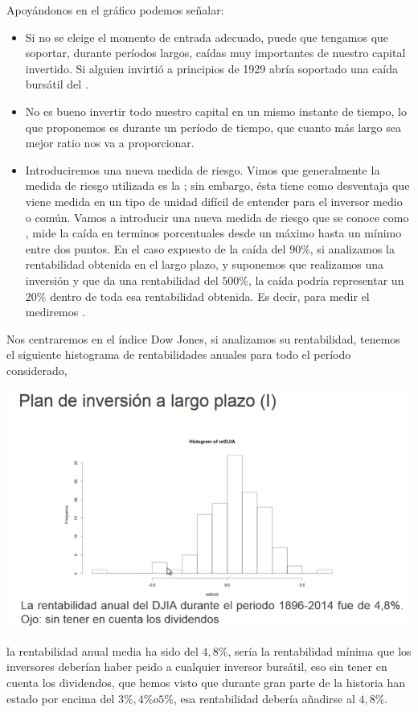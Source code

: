 Apoyándonos en el gráfico podemos señalar:
\begin{itemize}
    \item Si no se eleige el momento de entrada adecuado, puede que tengamos que soportar, durante períodos largos, caídas muy importantes de nuestro capital invertido. Si alguien invirtió a principios de 1929 abría soportado una caída bursátil del .
    \item No es bueno invertir todo nuestro capital en un mismo instante de tiempo, lo que proponemos es  durante un período de tiempo, que cuanto más largo sea mejor ratio  nos va a proporcionar.
    \item Introduciremos una nueva medida de riesgo. Vimos que generalmente la medida de riesgo utilizada es la ; sin embargo, ésta tiene como desventaja que viene medida en un tipo de unidad difícil de entender para el inversor medio o común. Vamos a introducir una nueva medida de riesgo que se conoce como , mide la caída en terminos porcentuales desde un máximo hasta un mínimo entre dos puntos. En el caso expuesto de la caída del $90\%$, si analizamos la rentabilidad obtenida en el largo plazo, y suponemos que realizamos una inversión y que da una rentabilidad del $500\%$, la caída podría representar un $20\%$ dentro de toda esa rentabilidad obtenida. Es decir, para medir el  mediremos .
\end{itemize}

Nos centraremos en el índice Dow Jones, si analizamos su rentabilidad, tenemos el siguiente histograma de rentabilidades anuales para todo el período considerado,
\begin{center}
    \includegraphics[scale=.65]{images/mod03-02.png}
\end{center}
la rentabilidad anual media ha sido del $4,8\%$, sería la rentabilidad mínima que los inversores deberían haber peido a cualquier inversor bursátil, eso sin tener en cuenta los dividendos, que hemos visto que durante gran parte de la historia han estado por encima del $3\%, 4\% o 5\%$, esa rentabilidad debería añadirse al $4,8\%$.

